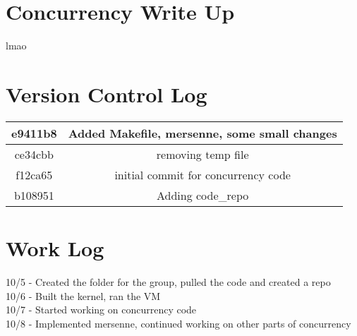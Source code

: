 \documentclass[onecolumn, draftclsnofoot,10pt, compsoc]{IEEEtran}
\begin{document}
\section{Concurrency Write Up}

	lmao

\section{Version Control Log}

\begin{tabular}{ c | c }
	\hline
	e9411b8 &	 Added Makefile, mersenne, some small changes \\
  \hline
  ce34cbb &  removing temp file \\
	\hline
  f12ca65 & initial commit for concurrency code \\
	\hline
  b108951 &  Adding code\_repo \\
  \hline
\end{tabular}

\section{Work Log}

	10/5 - Created the folder for the group, pulled the code and created a repo \\
	10/6 - Built the kernel, ran the VM \\
	10/7 - Started working on concurrency code \\
	10/8 - Implemented mersenne, continued working on other parts of concurrency\\
\end{document}
